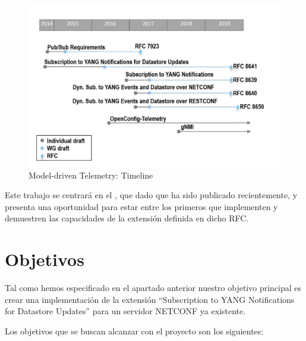     \begin{figure}[H]
        \centering
        \includegraphics[scale=.5]{graphics/telemetry-history-2-1024x657.jpg}
        \caption{Model-driven Telemetry: Timeline}
        \label{fig:telemetry_history}
    \end{figure}
    
    Este trabajo se centrará en el \cite{RFC8641}, que dado que ha sido publicado recientemente, y presenta una oportunidad para estar entre los primeros que implementen y demuestren las capacidades de la extensión definida en dicho \gls{RFC}.

\section{Objetivos}
    Tal como hemos especificado en el apartado anterior nuestro objetivo principal es crear una implementación de la extensión \enquote{Subscription to YANG Notifications for Datastore Updates} para un servidor NETCONF ya existente.

Los objetivos que se buscan alcanzar con el proyecto son los siguientes:

